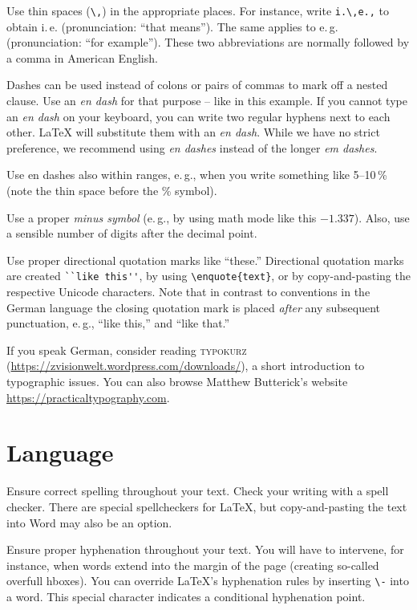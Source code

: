 Use thin spaces (\verb|\,|) in the appropriate places. For instance, write \verb|i.\,e.,| to obtain i.\,e. (pronunciation: ``that means''). The same applies to e.\,g. (pronunciation: ``for example''). These two abbreviations are normally followed by a comma in American English.

Dashes can be used instead of colons or pairs of commas to mark off a nested clause. Use an \emph{en dash} for that purpose -- like in this example. If you cannot type an \emph{en dash} on your keyboard, you can write two regular hyphens next to each other. LaTeX will substitute them with an \emph{en dash}. While we have no strict preference, we recommend using \emph{en dashes} instead of the longer \emph{em dashes}.

Use en dashes also within ranges, e.\,g., when you write something like 5--10\,\% (note the thin space before the \% symbol).

Use a proper \emph{minus symbol} (e.\,g., by using math mode like this \(-1.337\)). Also, use a sensible number of digits after the decimal point.

Use proper directional quotation marks like ``these.'' Directional quotation marks are created  \verb|``like this''|, by using \verb|\enquote{text}|, or by copy-and-pasting the respective Unicode characters. Note that in contrast to conventions in the German language the closing quotation mark is placed \emph{after} any subsequent punctuation, e.\,g., ``like this,'' and ``like that.''

If you speak German, consider reading \textsc{typokurz} (\url{https://zvisionwelt.wordpress.com/downloads/}), a short introduction to typographic issues. You can also browse Matthew Butterick's website \url{https://practicaltypography.com}.

\section{Language}

Ensure correct spelling throughout your text. Check your writing with a spell checker. There are special spellcheckers for LaTeX, but copy-and-pasting the text into Word may also be an option.

Ensure proper hyphenation throughout your text. You will have to intervene, for instance, when words extend into the margin of the page (creating so-called overfull hboxes). You can override LaTeX's hyphenation rules by inserting \verb|\-| into a word. This special character indicates a conditional hyphenation point.

